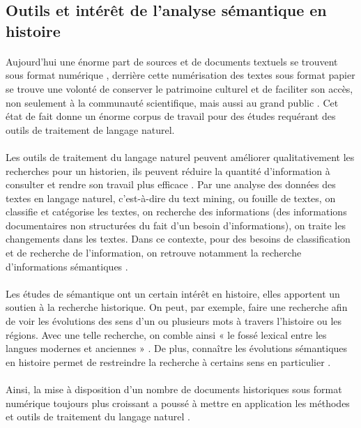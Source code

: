 \documentclass{article}
\begin{document}
\subsection{Outils et intérêt de l'analyse sémantique en histoire}
\paragraph{}
Aujourd’hui une énorme part de sources et de documents textuels se trouvent sous format numérique \cite{glazkova2017automatic}, derrière cette numérisation des textes sous format papier se trouve une volonté de conserver le patrimoine culturel et de faciliter son accès, non seulement à la communauté scientifique, mais aussi au grand public \cite{liebeskind2020deep}. Cet état de fait donne un énorme corpus de travail pour des études requérant des outils de traitement de langage naturel. 
\paragraph{}
Les outils de traitement du langage naturel peuvent améliorer qualitativement les recherches pour un historien, ils peuvent réduire la quantité d’information à consulter et rendre son travail plus efficace \cite{glazkova2017automatic}. Par une analyse des données des textes en langage naturel, c’est-à-dire du text mining, ou fouille de textes, on classifie et catégorise les textes, on recherche des informations (des informations documentaires non structurées du fait d’un besoin d’informations), on traite les changements dans les textes. Dans ce contexte, pour des besoins de classification et de recherche de l’information, on retrouve notamment la recherche d’informations sémantiques \cite{glazkova2017automatic}. 
\paragraph{}
Les études de sémantique ont un certain intérêt en histoire, elles apportent un soutien à la recherche historique. On peut, par exemple, faire une recherche afin de voir les évolutions des sens d’un ou plusieurs mots à travers l’histoire ou les régions. Avec une telle recherche, on comble ainsi « le fossé lexical entre les langues modernes et anciennes » \cite{liebeskind2020deep}. De plus, connaître les évolutions sémantiques en histoire permet de restreindre la recherche à certains sens en particulier \cite{perrone2019gasc}. 
\paragraph{}
Ainsi, la mise à disposition d’un nombre de documents historiques sous format numérique toujours plus croissant a poussé à mettre en application les méthodes et outils de traitement du langage naturel \cite{liebeskind2020deep}. 
\end{document}
